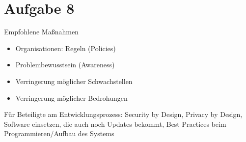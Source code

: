 \documentclass{article}
\begin{document}
	\section*{Aufgabe 8}
	Empfohlene Maßnahmen
	\begin{itemize}
		\item Organisationen: Regeln (Policies)
		\item Problembewusstsein (Awareness)
		\item Verringerung möglicher Schwachstellen
		\item Verringerung möglicher Bedrohungen
	\end{itemize}
	Für Beteiligte am Entwicklungsprozess: Security by Design, Privacy  by Design, Software einsetzen, die auch noch Updates bekommt, Best Practices beim Programmieren/Aufbau des Systems
\end{document}
